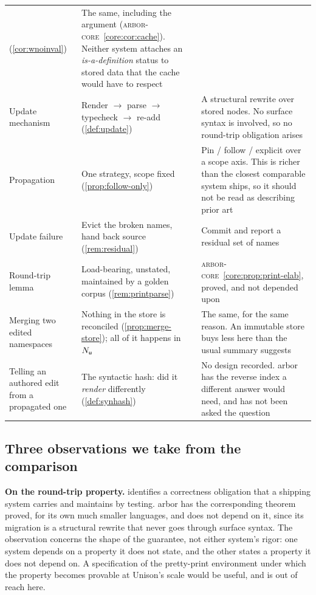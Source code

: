\documentclass[11pt]{article}
\theoremstyle{definition}
\theoremstyle{plain}
\theoremstyle{remark}
\newcommand{\arborcore}{\textsc{arbor-core}}
\newcommand{\coreref}[1]{\arborcore~\cref{core:#1}}
\begin{document}
\begin{center}
\begin{tabular}{@{}p{}p{}p{}@{}}
  (\cref{cor:wnoinval})
& The same, including the argument (\coreref{cor:cache}). Neither system attaches an
  \emph{is-a-definition} status to stored data that the cache would have to respect \\
\addlinespace
Update mechanism
& Render $\to$ parse $\to$ typecheck $\to$ re-add (\cref{def:update})
& A structural rewrite over stored nodes. No surface syntax is involved, so no round-trip obligation
  arises \\
\addlinespace
Propagation
& One strategy, scope fixed (\cref{prop:follow-only})
& Pin / follow / explicit over a scope axis. This is richer than the closest comparable system ships,
  so it should not be read as describing prior art \\
\addlinespace
Update failure
& Evict the broken names, hand back source (\cref{rem:residual})
& Commit and report a residual set of names \\
\addlinespace
Round-trip lemma
& Load-bearing, unstated, maintained by a golden corpus (\cref{rem:printparse})
& \coreref{prop:print-elab}, proved, and not depended upon \\
\addlinespace
Merging two edited namespaces
& Nothing in the store is reconciled (\cref{prop:merge-store}); all of it happens in $N_{\mathsf{u}}$
& The same, for the same reason. An immutable store buys less here than the usual summary suggests \\
\addlinespace
Telling an authored edit from a propagated one
& The syntactic hash: did it \emph{render} differently (\cref{def:synhash})
& No design recorded. arbor has the reverse index a different answer would need, and has not been
  asked the question \\
\bottomrule
\end{tabular}
\end{center}

\subsection*{Three observations we take from the comparison}

\textbf{On the round-trip property.}  identifies a correctness obligation that
a shipping system carries and maintains by testing. arbor has the corresponding theorem proved, for
its own much smaller languages, and does not depend on it, since its migration is a structural
rewrite that never goes through surface syntax. The observation concerns the shape of the guarantee,
not either system's rigor: one system depends on a property it does not state, and the other states a
property it does not depend on. A specification of the pretty-print environment under which the
property becomes provable at Unison's scale would be useful, and is out of reach here.
\end{document}
